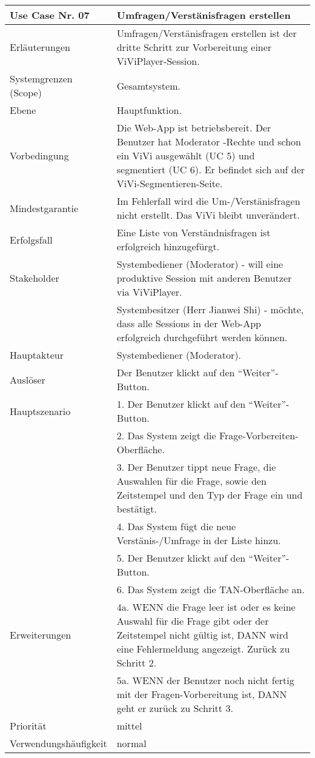 \begin{tabularx}{\linewidth}{|l|X|}
	\hline
	Use Case Nr. 07			& \textbf{Umfragen/Verstänisfragen erstellen} \\ \hline
	Erläuterungen			& Umfragen/Verstänisfragen erstellen ist der dritte Schritt zur
							  Vorbereitung einer ViViPlayer-Session. \\ \hline
	Systemgrenzen (Scope)	& Gesamtsystem. \\ \hline
	Ebene					& Hauptfunktion. \\ \hline
	Vorbedingung			& Die Web-App ist betriebsbereit. Der Benutzer hat Moderator
							  -Rechte und schon ein ViVi ausgewählt (UC 5) und segmentiert (UC 6). Er befindet sich auf der ViVi-Segmentieren-Seite. \\ \hline
	Mindestgarantie			& Im Fehlerfall wird die Um-/Verstänisfragen nicht erstellt. Das ViVi 
							  bleibt unverändert. \\ \hline
	Erfolgsfall    			& Eine Liste von Verständnisfragen ist erfolgreich hinzugefürgt.
							  \\ \hline
	Stakeholder				& Systembediener (Moderator) - will eine produktive Session mit 
							  anderen Benutzer via ViViPlayer. \\
							& Systembesitzer (Herr Jianwei Shi) - möchte, dass alle Sessions 
							  in der Web-App erfolgreich durchgeführt werden können. \\ \hline
	Hauptakteur				& Systembediener (Moderator). \\ \hline
	Auslöser				& Der Benutzer klickt auf den ``Weiter''-Button. \\ \hline	
	Hauptszenario			& 1. Der Benutzer klickt auf den ``Weiter''-Button. \\  
							& 2. Das System zeigt die Frage-Vorbereiten-Oberfläche. \\
							& 3. Der Benutzer tippt neue Frage, die Auswahlen für die 
							  Frage, sowie den Zeitstempel und den Typ der Frage ein und 
							  bestätigt. \\ 
							& 4. Das System fügt die neue Verstänis-/Umfrage in der Liste
							  hinzu. \\ 
							& 5. Der Benutzer klickt auf den ``Weiter''-Button. \\ 
							& 6. Das System zeigt die TAN-Oberfläche an. \\ \hline
	Erweiterungen			& 4a. WENN die Frage leer ist oder es keine Auswahl für die 
							  Frage gibt oder der Zeitstempel nicht gültig ist, DANN wird eine 
							  Fehlermeldung angezeigt. Zurück zu Schritt 2. \\ 
							& 5a. WENN der Benutzer noch nicht fertig mit der 
							  Fragen-Vorbereitung ist, DANN geht er zurück zu Schritt 3. \\ \hline
	Priorität				& mittel \\ \hline
	Verwendungshäufigkeit	& normal \\ \hline
\end{tabularx}